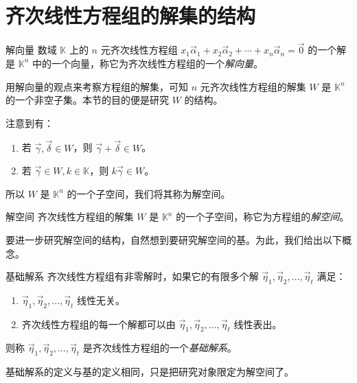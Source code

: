 
\section{齐次线性方程组的解集的结构}

\begin{definition}{解向量}
	数域 $\mathbb K$ 上的 $n$ 元齐次线性方程组 $x_1 \vec \alpha_1 + x_2 \vec \alpha_2 + \cdots + x_n \vec \alpha_n = \vec 0$ 的一个解是 $\mathbb K^n$ 中的一个向量，称它为齐次线性方程组的一个\emph{解向量}。
\end{definition}

用解向量的观点来考察方程组的解集，可知 $n$ 元齐次线性方程组的解集 $W$ 是 $\mathbb K^n$ 的一个非空子集。本节的目的便是研究 $W$ 的结构。

注意到有：
\begin{enumerate}
	\item 若 $\vec \gamma, \vec \delta \in W$，则 $\vec \gamma + \vec \delta \in W$。
	\item 若 $\vec \gamma \in W, k \in \mathbb K$，则 $k \vec \gamma \in W$。
\end{enumerate}

所以 $W$ 是 $\mathbb K^n$ 的一个子空间，我们将其称为解空间。

\begin{definition}{解空间}
	齐次线性方程组的解集 $W$ 是 $\mathbb K^n$ 的一个子空间，称它为方程组的\emph{解空间}。
\end{definition}

要进一步研究解空间的结构，自然想到要研究解空间的基。为此，我们给出以下概念。

\begin{definition}{基础解系}
	齐次线性方程组有非零解时，如果它的有限多个解 $\vec \eta_1, \vec \eta_2, \ldots, \vec \eta_t$ 满足：
	\begin{enumerate}
		\item $\vec \eta_1, \vec \eta_2, \ldots, \vec \eta_t$ 线性无关。
		\item 齐次线性方程组的每一个解都可以由 $\vec \eta_1, \vec \eta_2, \ldots, \vec \eta_t$ 线性表出。
	\end{enumerate}
	则称 $\vec \eta_1, \vec \eta_2, \ldots, \vec \eta_t$ 是齐次线性方程组的一个\emph{基础解系}。
\end{definition}

基础解系的定义与基的定义相同，只是把研究对象限定为解空间了。


